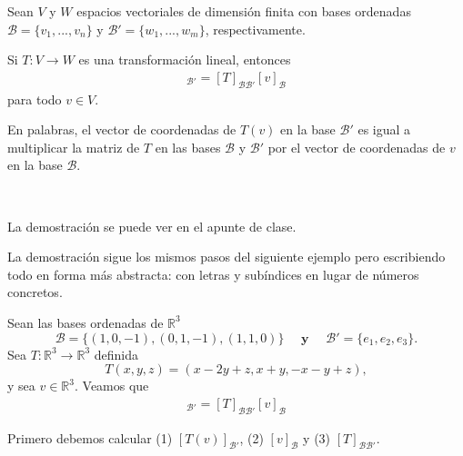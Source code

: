 \documentclass[handout]{beamer} %
\newcommand{\R}{\mathbb R}
\newcommand{\cB}{\mathcal{B}}
\begin{document}
    
\begin{frame}

    \begin{proposicion}
    Sean $V$ y $W$ espacios vectoriales de dimensión finita con bases ordenadas $\cB=\{v_1, ..., v_n\}$ y $\cB'=\{w_1, ..., w_m\}$, respectivamente. 
    
    Si $T:V\longrightarrow W$ es una transformación lineal, entonces
    \begin{align*}
    [T(v)]_{\cB'}=[T]_{\cB\cB'}[v]_{\cB}
    \end{align*}
    para todo $v\in V$.
    \end{proposicion}
    \pause
    En palabras, el vector de coordenadas de $T(v)$ en la base $\cB'$ es igual a multiplicar la matriz de $T$ en las bases $\cB$ y $\cB'$ por el vector de coordenadas de $v$ en la base $\cB$.
    
    \
    
    
    
    \end{frame}
    
    \begin{frame}
    La demostración se puede ver en el apunte de clase.
    \pause
    \
    
    La demostración sigue los mismos pasos del siguiente ejemplo pero escribiendo todo en forma más abstracta: con letras y subíndices en lugar de números concretos.
    \end{frame}
    
    

    
    \begin{frame}
        \begin{ejemplo}
            Sean las bases ordenadas de $\R^3$
            $$\cB = \{(1,0,-1),(0,1,-1),(1,1,0)\}\quad \textbf{ y } \quad\cB' = \{e_1,e_2,e_3\}.$$ 
            Sea $T: \R^3 \to \R^3$ definida
            $$
            T(x,y,z) = (x-2y+z, x+y, -x-y+z),
            $$ 
            y sea $v \in \R^3$. Veamos  que 
        \begin{align*}
            [T(v)]_{\cB'}=[T]_{\cB\cB'}[v]_{\cB}
            \end{align*}
        \end{ejemplo}\pause
        \begin{solucion}\pause
            Primero debemos calcular (1) $[T(v)]_{\cB'}$,\; (2) $[v]_{\cB}$\; y \;(3) $[T]_{\cB\cB'}$.
        \end{solucion}	
    \end{frame}
\end{document}
